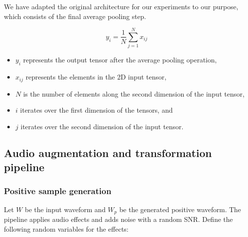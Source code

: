 We have adapted the original architecture for our experiments to our purpose, which consists of the final average pooling step.

\begin{equation}
y_i = \frac{1}{N} \sum_{j=1}^{N} x_{ij}
\end{equation}

\begin{itemize}
  \item \(y_i\) represents the output tensor after the average pooling operation,
  \item \(x_{ij}\) represents the elements in the 2D input tensor,
  \item \(N\) is the number of elements along the second dimension of the input tensor,
  \item \(i\) iterates over the first dimension of the tensors, and
  \item \(j\) iterates over the second dimension of the input tensor.
\end{itemize}


\subsection{Audio augmentation and transformation pipeline}
\subsubsection{Positive sample generation}
Let $W$ be the input waveform and $W_p$ be the generated positive waveform. The pipeline applies audio effects and adds noise with a random SNR. Define the following random variables for the effects:

